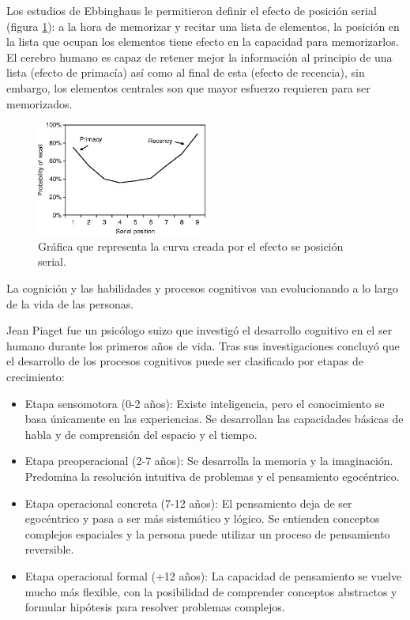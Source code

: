 Los estudios de Ebbinghaus le permitieron definir el efecto de posición serial (figura \ref{fig:EA_posicionSerial}): a la hora de memorizar y recitar una lista de elementos, la posición en la lista que ocupan los elementos tiene efecto en la capacidad para memorizarlos. El cerebro humano es capaz de retener mejor la información al principio de una lista (efecto de primacía) así como al final de esta (efecto de recencia), sin embargo, los elementos centrales son que mayor esfuerzo requieren para ser memorizados.



\begin{figure}
  \centering
\includegraphics[width=0.5\textwidth]{03.EstudioProblema/01.EstadoArte/00.Figuras/01.efecto_serial.jpg}
    \caption{Gráfica que representa la curva creada por el efecto se posición serial. \cite{EA_img_efectoPosicionSerial}}
    \label{fig:EA_posicionSerial}
\end{figure}


La cognición y las habilidades y procesos cognitivos van evolucionando a lo largo de la vida de las personas.

Jean Piaget fue un psicólogo suizo que investigó el desarrollo cognitivo en el ser humano durante los primeros años de vida. Tras sus investigaciones concluyó que el desarrollo de los procesos cognitivos puede ser clasificado por etapas de crecimiento:

\begin{itemize}
	\item{Etapa sensomotora (0-2 años): Existe inteligencia, pero el conocimiento se basa únicamente en las experiencias. Se desarrollan las capacidades básicas de habla y de comprensión del espacio y el tiempo.}

	\item{Etapa preoperacional (2-7 años): Se desarrolla la memoria y la imaginación. Predomina la resolución intuitiva de problemas y el pensamiento egocéntrico.}

	\item{Etapa operacional concreta (7-12 años): El pensamiento deja de ser egocéntrico y pasa a ser más sistemático y lógico. Se entienden conceptos complejos espaciales y la persona puede utilizar un proceso de pensamiento reversible.}

	\item{Etapa operacional formal (+12 años): La capacidad de pensamiento se vuelve mucho más flexible, con la posibilidad de comprender conceptos abstractos y formular hipótesis para resolver problemas complejos.}

\end{itemize}

